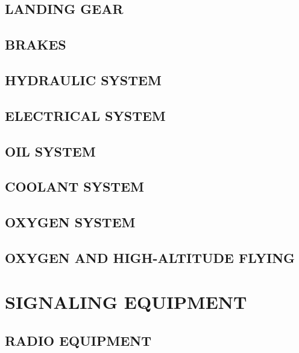 \subsection{LANDING GEAR}
\subsection{BRAKES}
\subsection{HYDRAULIC SYSTEM}
\subsection{ELECTRICAL SYSTEM}
\subsection{OIL SYSTEM}
\subsection{COOLANT SYSTEM}
\subsection{OXYGEN SYSTEM}
\subsection{OXYGEN AND HIGH-ALTITUDE FLYING}


\section{SIGNALING EQUIPMENT}
\subsection{RADIO EQUIPMENT}
